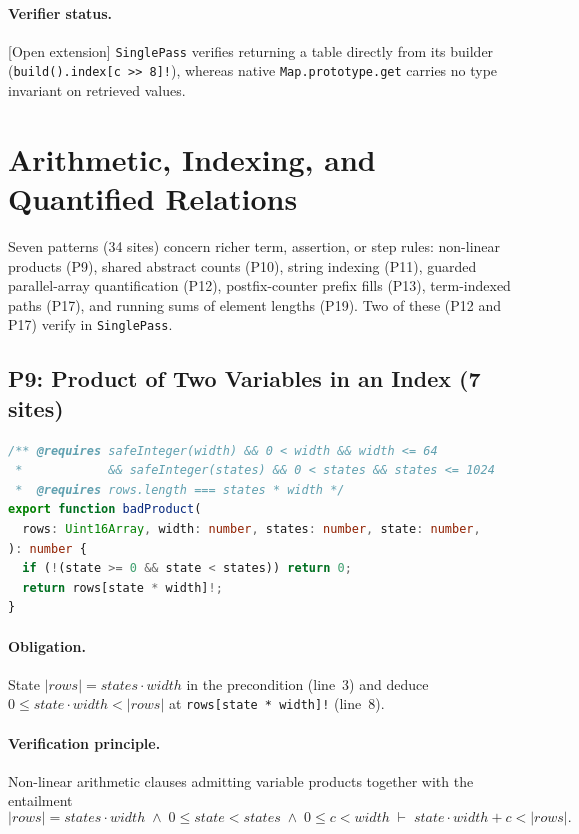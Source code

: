 \documentclass[10pt,a4paper]{article}
\newcommand{\len}[1]{|#1|}
\newcommand{\code}[1]{\textcolor{codec}{\texttt{#1}}}
\newcommand{\lean}[1]{\texttt{\small #1}}
\newcommand{\statusc}[1]{\textcolor{conjc}{\textsf{\small[#1]}}}
\newcommand{\entry}[1]{\paragraph{#1.}}
\renewcommand{\lean}[1]{\textcolor{leanc}{\texttt{\small #1}}}%
\begin{document}
\entry{Verifier status}
\statusc{Open extension} \lean{SinglePass} verifies returning a table
directly from its builder (\code{build().index[c >{}> 8]!}), whereas
native \code{Map.prototype.get} carries no type invariant on retrieved
values.

\section{Arithmetic, Indexing, and Quantified Relations}\label{sec:arith}

Seven patterns (34 sites) concern richer term, assertion, or step rules:
non-linear products (P9), shared abstract counts (P10), string indexing
(P11), guarded parallel-array quantification (P12), postfix-counter
prefix fills (P13), term-indexed paths (P17), and running sums of
element lengths (P19). Two of these (P12 and P17) verify in
\lean{SinglePass}.

\subsection{P9: Product of Two Variables in an Index (7 sites)}\label{sec:p9}

\begin{lstlisting}[language=TypeScript]
/** @requires safeInteger(width) && 0 < width && width <= 64
 *            && safeInteger(states) && 0 < states && states <= 1024
 *  @requires rows.length === states * width */
export function badProduct(
  rows: Uint16Array, width: number, states: number, state: number,
): number {
  if (!(state >= 0 && state < states)) return 0;
  return rows[state * width]!;
}
\end{lstlisting}

\entry{Obligation}
State $\len{\mathit{rows}}=\mathit{states}\cdot\mathit{width}$ in the
precondition (line~3) and deduce
$0\le\mathit{state}\cdot\mathit{width}<\len{\mathit{rows}}$ at
\code{rows[state * width]!} (line~8).

\entry{Verification principle}
Non-linear arithmetic clauses admitting variable products together with
the entailment
\[
  \len{\mathit{rows}} = \mathit{states}\cdot\mathit{width}
  \;\wedge\; 0\le\mathit{state}<\mathit{states}
  \;\wedge\; 0\le c<\mathit{width}
  \;\vdash\; \mathit{state}\cdot\mathit{width} + c < \len{\mathit{rows}}.
\]
\end{document}

